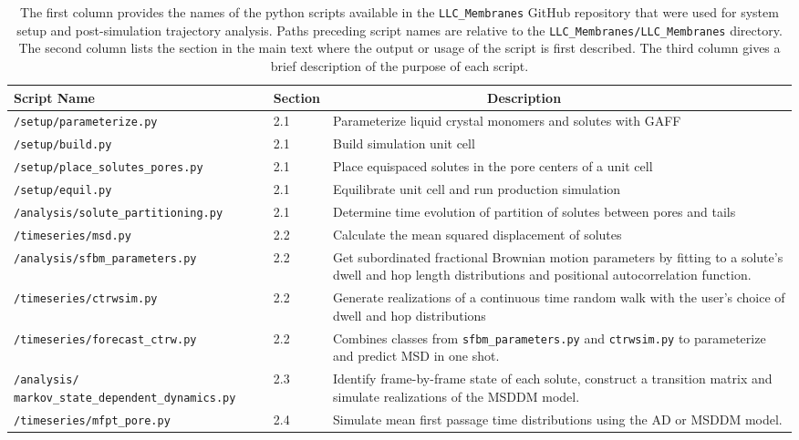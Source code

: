 \documentclass{article}
\begin{document}
  \begin{table}[htb!]
  \centering
  \begin{tabular}{|A|B|C|}
  \hline
  \textbf{Script Name} & \textbf{Section} & ~~~~~~~~~~~~~~~~~~~~~\textbf{Description} \\
  \hline

  \texttt{/setup/parameterize.py}            & 2.1 & Parameterize liquid crystal monomers and solutes with GAFF \\ \hline
  \texttt{/setup/build.py}                   & 2.1 & Build simulation unit cell \\ \hline
  \texttt{/setup/place\_solutes\_pores.py}   & 2.1 & Place equispaced solutes in the pore centers of a unit cell \\\hline
  \texttt{/setup/equil.py}                   & 2.1 & Equilibrate unit cell and run production simulation \\\hline
  \texttt{/analysis/solute\_partitioning.py} & 2.1 & Determine time evolution of partition of solutes between pores and tails \\\hline
  \texttt{/timeseries/msd.py}                & 2.2 & Calculate the mean squared displacement of solutes \\\hline
  \texttt{/analysis/sfbm\_parameters.py}     & 2.2 & Get subordinated fractional Brownian motion parameters by fitting to a solute's dwell and hop length distributions and positional autocorrelation function. \\\hline
  \texttt{/timeseries/ctrwsim.py}            & 2.2 & Generate realizations of a continuous time random walk with the user's choice of dwell and hop distributions \\\hline
  \texttt{/timeseries/forecast\_ctrw.py}     & 2.2 & Combines classes from \texttt{sfbm\_parameters.py} and \texttt{ctrwsim.py} to parameterize and predict MSD in one shot. \\\hline
  \texttt{/analysis/ markov\_state\_dependent\_dynamics.py} & 2.3 & Identify frame-by-frame state of each solute, construct a transition matrix and simulate realizations of the MSDDM model. \\\hline
  \texttt{/timeseries/mfpt\_pore.py}          & 2.4 & Simulate mean first passage time distributions using the AD or MSDDM model. \\\hline
  
  \end{tabular}

  \caption{The first column provides the names of the python scripts available in
  the \texttt{LLC\_Membranes} GitHub repository that were used for system setup and
  post-simulation trajectory analysis. Paths preceding script names are relative to the
  \texttt{LLC\_Membranes/LLC\_Membranes} directory. The second column lists the section in the main
  text where the output or usage of the script is first described. The third column
  gives a brief description of the purpose of each script.
  }~\label{table:python_scripts}

  \end{table}
  
\end{document}
